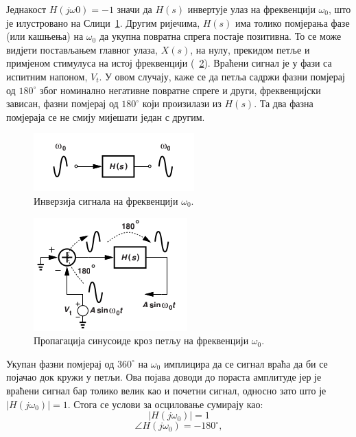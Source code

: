 \documentclass[master]{finthesis}
\begin{document}
Једнакост $H(j\omega{0})=-1$ значи да $H(s)$ инвертује улаз на фреквенцији $\omega_{0}$, што је илустровано на Слици~\ref{osc_feedback_3}. Другим ријечима, $H(s)$ има толико помјерања фазе (или кашњења) на $\omega_{0}$ да укупна повратна спрега постаје позитивна. То се може видјети постављањем главног улаза, $X(s)$, на нулу, прекидом петље и примјеном стимулуса на истој фреквенцији (\figurename~\ref{osc_feedback_4}). Враћени сигнал је у фази са испитним напоном, $V_{t}$. У овом случају, каже се да петља садржи фазни помјерај од $180^{\circ}$ због номинално негативне повратне спреге и други, фреквенцијски зависан, фазни помјерај од $180^{\circ}$ који произилази из $H(s)$. Та два фазна помјераја се не смију мијешати један с другим. \par
\begin{figure}[!ht]
	 \centering
	 \includegraphics[scale=0.8]{slike/osc_feedback_3.png}
	 \caption{Инверзија сигнала на фреквенцији $\omega_{0}$.}
	 \label{osc_feedback_3}
\end{figure}
\begin{figure}[!ht]
	 \centering
	 \includegraphics[scale=0.8]{slike/osc_feedback_4.png}
	 \caption{Пропагација синусоиде кроз петљу на фреквенцији $\omega_{0}$.}
	 \label{osc_feedback_4}
\end{figure}
Укупан фазни помјерај од $360^{\circ}$ на $\omega_{0}$ имплицира да се сигнал враћа да би се појачао док кружи у петљи. Ова појава доводи до пораста амплитуде јер је враћени сигнал бар толико велик као и почетни сигнал, односно зато што је $|H(j\omega_{0})|=1$. Стога се услови за осциловање сумирају као:
\begin{equation} 
	\label{osc_condition_1}
	|H(j\omega_{0})| = 1
\end{equation}
\begin{equation} 
	\label{osc_condition_2}
	\angle H(j\omega_{0}) = -180^{\circ},
\end{equation}
\end{document}

